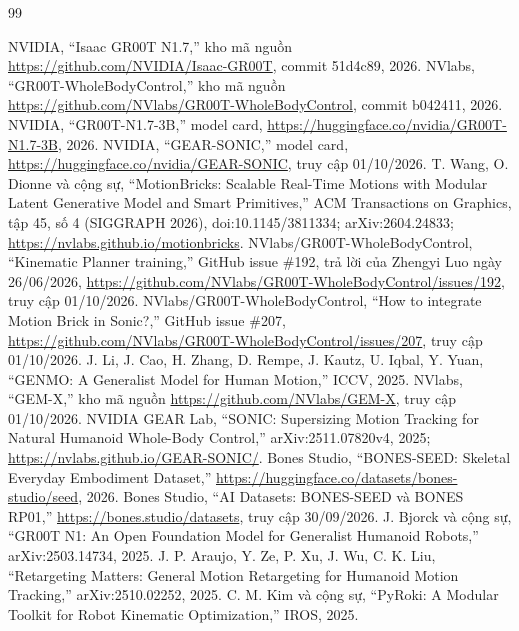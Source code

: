 \documentclass[12pt,a4paper,oneside]{report}
\begin{document}
\renewcommand{\bibname}{TÀI LIỆU THAM KHẢO}
\begin{thebibliography}{99}
 NVIDIA, ``Isaac GR00T N1.7,'' kho mã nguồn \url{https://github.com/NVIDIA/Isaac-GR00T}, commit 51d4c89, 2026.
 NVlabs, ``GR00T-WholeBodyControl,'' kho mã nguồn \url{https://github.com/NVlabs/GR00T-WholeBodyControl}, commit b042411, 2026.
 NVIDIA, ``GR00T-N1.7-3B,'' model card, \url{https://huggingface.co/nvidia/GR00T-N1.7-3B}, 2026.
 NVIDIA, ``GEAR-SONIC,'' model card, \url{https://huggingface.co/nvidia/GEAR-SONIC}, truy cập 01/10/2026.
 T. Wang, O. Dionne và cộng sự, ``MotionBricks: Scalable Real-Time Motions with Modular Latent Generative Model and Smart Primitives,'' ACM Transactions on Graphics, tập 45, số 4 (SIGGRAPH 2026), doi:10.1145/3811334; arXiv:2604.24833; \url{https://nvlabs.github.io/motionbricks}.
 NVlabs/GR00T-WholeBodyControl, ``Kinematic Planner training,'' GitHub issue \#192, trả lời của Zhengyi Luo ngày 26/06/2026, \url{https://github.com/NVlabs/GR00T-WholeBodyControl/issues/192}, truy cập 01/10/2026.
 NVlabs/GR00T-WholeBodyControl, ``How to integrate Motion Brick in Sonic?,'' GitHub issue \#207, \url{https://github.com/NVlabs/GR00T-WholeBodyControl/issues/207}, truy cập 01/10/2026.
 J. Li, J. Cao, H. Zhang, D. Rempe, J. Kautz, U. Iqbal, Y. Yuan, ``GENMO: A Generalist Model for Human Motion,'' ICCV, 2025.
 NVlabs, ``GEM-X,'' kho mã nguồn \url{https://github.com/NVlabs/GEM-X}, truy cập 01/10/2026.
 NVIDIA GEAR Lab, ``SONIC: Supersizing Motion Tracking for Natural Humanoid Whole-Body Control,'' arXiv:2511.07820v4, 2025; \url{https://nvlabs.github.io/GEAR-SONIC/}.
 Bones Studio, ``BONES-SEED: Skeletal Everyday Embodiment Dataset,'' \url{https://huggingface.co/datasets/bones-studio/seed}, 2026.
 Bones Studio, ``AI Datasets: BONES-SEED và BONES RP01,'' \url{https://bones.studio/datasets}, truy cập 30/09/2026.
 J. Bjorck và cộng sự, ``GR00T N1: An Open Foundation Model for Generalist Humanoid Robots,'' arXiv:2503.14734, 2025.
 J. P. Araujo, Y. Ze, P. Xu, J. Wu, C. K. Liu, ``Retargeting Matters: General Motion Retargeting for Humanoid Motion Tracking,'' arXiv:2510.02252, 2025.
 C. M. Kim và cộng sự, ``PyRoki: A Modular Toolkit for Robot Kinematic Optimization,'' IROS, 2025.

\end{thebibliography}
\end{document}
